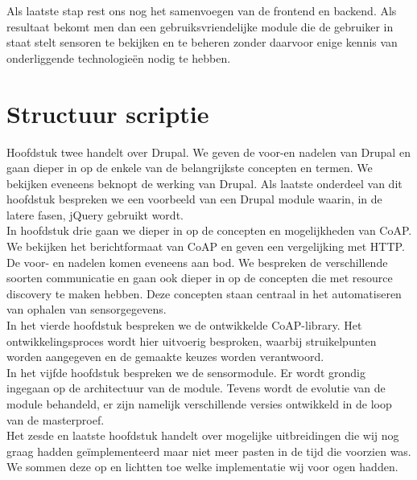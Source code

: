 Als laatste stap rest ons nog het samenvoegen van de frontend en backend. Als resultaat bekomt men dan een gebruiksvriendelijke module die de gebruiker in staat stelt sensoren te bekijken en te beheren zonder daarvoor enige kennis van onderliggende technologie\"{e}n nodig te hebben.


\section{Structuur scriptie}

Hoofdstuk twee handelt over Drupal. We geven de voor-en nadelen van Drupal en gaan dieper in op de enkele van de belangrijkste concepten en termen. We bekijken eveneens beknopt de werking van Drupal. Als laatste onderdeel van dit hoofdstuk bespreken we een voorbeeld van een Drupal module waarin, in de latere fasen, jQuery gebruikt wordt.\\

In hoofdstuk drie gaan we dieper in op de concepten en mogelijkheden van CoAP. We bekijken het berichtformaat van CoAP en geven een vergelijking met HTTP. De voor- en nadelen komen eveneens aan bod. We bespreken de verschillende soorten communicatie en gaan ook dieper in op de concepten die met resource discovery te maken hebben. Deze concepten staan centraal in het automatiseren van ophalen van sensorgegevens.\\

In het vierde hoofdstuk bespreken we de ontwikkelde CoAP-library. Het ontwikkelingsproces wordt hier uitvoerig besproken, waarbij struikelpunten worden aangegeven en de gemaakte keuzes worden verantwoord.\\

In het vijfde hoofdstuk bespreken we de sensormodule. Er wordt grondig ingegaan op de architectuur van de module. Tevens wordt de evolutie van de module behandeld, er zijn namelijk verschillende versies ontwikkeld in de loop van de masterproef.\\

Het zesde en laatste hoofdstuk handelt over mogelijke uitbreidingen die wij nog graag hadden ge\"{i}mplementeerd maar niet meer pasten in de tijd die voorzien was. We sommen deze op en lichtten toe welke implementatie wij voor ogen hadden.










